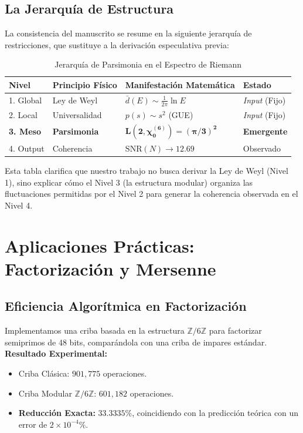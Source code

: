 \documentclass[12pt, a4paper]{article}
\theoremstyle{plain}
\theoremstyle{definition}
\theoremstyle{remark}
\begin{document}
\subsection{La Jerarquía de Estructura}

La consistencia del manuscrito se resume en la siguiente jerarquía de restricciones, que sustituye a la derivación especulativa previa:

\begin{table}[H]
\centering
\caption{Jerarquía de Parsimonia en el Espectro de Riemann}
\label{tab:jerarquia}
\begin{tabular}{@{}llll@{}}
\toprule
\textbf{Nivel} & \textbf{Principio Físico} & \textbf{Manifestación Matemática} & \textbf{Estado} \\ \midrule
1. Global & Ley de Weyl & $\bar{d}(E) \sim \frac{1}{2\pi} \ln E$ & \textit{Input} (Fijo) \\
2. Local & Universalidad & $p(s) \sim s^2$ (GUE) & \textit{Input} (Fijo) \\
\textbf{3. Meso} & \textbf{Parsimonia} & $\mathbf{L(2,\chi_0^{(6)}) = (\pi/3)^2}$ & \textbf{Emergente} \\
4. Output & Coherencia & $\mathrm{SNR}(N) \to 12.69$ & Observado \\ \bottomrule
\end{tabular}
\end{table}

Esta tabla clarifica que nuestro trabajo no busca derivar la Ley de Weyl (Nivel 1), sino explicar cómo el Nivel 3 (la estructura modular) organiza las fluctuaciones permitidas por el Nivel 2 para generar la coherencia observada en el Nivel 4.

\section{Aplicaciones Prácticas: Factorización y Mersenne}
\label{ap:aplicaciones}

\subsection{Eficiencia Algorítmica en Factorización}
Implementamos una criba basada en la estructura $\mathbb{Z}/6\mathbb{Z}$ para factorizar semiprimos de 48 bits, comparándola con una criba de impares estándar.
\textbf{Resultado Experimental:}
\begin{itemize}
    \item Criba Clásica: $901,775$ operaciones.
    \item Criba Modular $\mathbb{Z}/6\mathbb{Z}$: $601,182$ operaciones.
    \item \textbf{Reducción Exacta:} $33.3335\%$, coincidiendo con la predicción teórica con un error de $2 \times 10^{-4}\%$.
\end{itemize}
\end{document}
